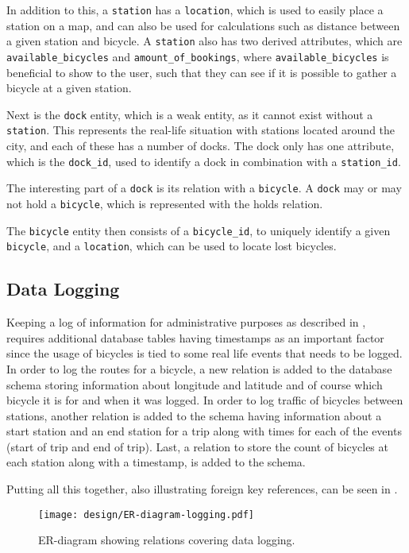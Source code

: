 In addition to this, a \texttt{station} has a \texttt{location}, which is used to easily place a station on a map, and can also be used for calculations such as distance between a given station and bicycle.
A \texttt{station} also has two derived attributes, which are \texttt{available_bicycles} and \texttt{amount_of_bookings}, where \texttt{available_bicycles} is beneficial to show to the user, such that they can see if it is possible to gather a bicycle at a given station.

Next is the \texttt{dock} entity, which is a weak entity, as it cannot exist without a \texttt{station}.
This represents the real-life situation with stations located around the city, and each of these has a number of docks.
The dock only has one attribute, which is the \texttt{dock_id}, used to identify a dock in combination with a \texttt{station_id}.

The interesting part of a \texttt{dock} is its relation with a \texttt{bicycle}.
A \texttt{dock} may or may not hold a \texttt{bicycle}, which is represented with the holds relation.

The \texttt{bicycle} entity then consists of a \texttt{bicycle_id}, to uniquely identify a given \texttt{bicycle}, and a \texttt{location}, which can be used to locate lost bicycles.

\subsection{Data Logging}
Keeping a log of information for administrative purposes as described in , requires additional database tables having timestamps as an important factor since the usage of bicycles is tied to some real life events that needs to be logged. 
In order to log the routes for a bicycle, a new relation is added to the database schema storing information about longitude and latitude and of course which bicycle it is for and when it was logged.
In order to log traffic of bicycles between stations, another relation is added to the schema having information about a start station and an end station for a trip along with times for each of the events (start of trip and end of trip).
Last, a relation to store the count of bicycles at each station along with a timestamp, is added to the schema.

Putting all this together, also illustrating foreign key references, can be seen in .

\begin{figure}[h]
\texttt{[image: design/ER-diagram-logging.pdf]}
\vspace*{-2cm}
\caption{ER-diagram showing relations covering data logging.}\label{fig:er-dia-log}
\end{figure}


